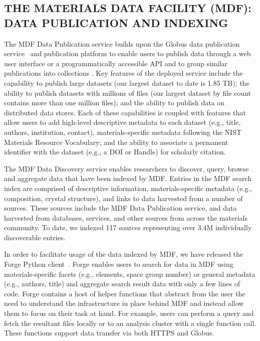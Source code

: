 \documentclass{aip-cp}
\newcommand\ryan[1]{}
\newcommand\ryan[1]{{\color{green}[Ryan: #1]}}
\begin{document}


\subsection{THE MATERIALS DATA FACILITY (MDF): DATA PUBLICATION AND INDEXING}

The MDF Data Publication service builds upon the Globus data
publication service~\cite{chard2015publication} and publication platform to enable
users to publish data through a web user interface or a
programmatically accessible API and to group similar publications into
collections \cite{MDF2016}. Key features of the deployed service include the capability to
publish large datasets (our largest dataset to date is 1.85 TB); the ability to
publish datasets with millions of files (our largest dataset by file count
contains more than one million files); and the ability to publish data on
distributed data stores. Each of these capabilities is coupled with
features that allow users to add high-level descriptive metadata to each dataset
(e.g., title, authors, institution, contact), materials-specific metadata
following the NIST Materials Resource Vocabulary; and the ability to associate
a permanent identifier with the dataset (e.g., a DOI or Handle) for scholarly
citation.

The MDF Data Discovery service enables researchers to discover, query, browse
and aggregate data that have been indexed by MDF. Entries in the MDF search
index are comprised of descriptive information, materials-specific metadata
(e.g., composition, crystal structure), and links to data harvested from a
number of sources. These sources include the MDF Data Publication service, and
data harvested from databases, services, and other sources from across the
materials community. To date, we indexed 117 sources representing over 3.4M
individually discoverable entries.

In order to facilitate usage of the data indexed by MDF, we have released the
Forge Python client~\cite{forge}. Forge enables users to search for data in MDF using
materials-specific facets (e.g., elements, space group number) or general
metadata (e.g., authors, title) and aggregate search result data with only a
few lines of code. Forge contains a host of helper functions that
abstract from the user the need to understand the infrastructure in place
behind MDF and instead allow them to focus on their task at hand. For example,
users can perform a query and fetch the resultant files locally or to an
analysis cluster with a single function call. These functions support data
transfer via both HTTPS and Globus.
\end{document}
